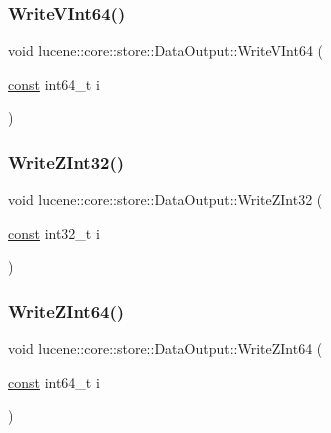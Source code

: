 \subsubsection{\texorpdfstring{Write\+V\+Int64()}{WriteVInt64()}}
{\footnotesize\ttfamily void lucene\+::core\+::store\+::\+Data\+Output\+::\+Write\+V\+Int64 (\begin{DoxyParamCaption}\item[{\mbox{\hyperlink{ZlibCrc32_8h_a2c212835823e3c54a8ab6d95c652660e}{const}} int64\+\_\+t}]{i }\end{DoxyParamCaption})\hspace{0.3cm}{\ttfamily [inline]}}

\mbox{\label{classlucene_1_1core_1_1store_1_1DataOutput_ac3a56b74f30cd1f61c7cd40d17830700}} 
\subsubsection{\texorpdfstring{Write\+Z\+Int32()}{WriteZInt32()}}
{\footnotesize\ttfamily void lucene\+::core\+::store\+::\+Data\+Output\+::\+Write\+Z\+Int32 (\begin{DoxyParamCaption}\item[{\mbox{\hyperlink{ZlibCrc32_8h_a2c212835823e3c54a8ab6d95c652660e}{const}} int32\+\_\+t}]{i }\end{DoxyParamCaption})\hspace{0.3cm}{\ttfamily [inline]}}

\mbox{\label{classlucene_1_1core_1_1store_1_1DataOutput_aad0abddbe300bdf599bf7464538891c1}} 
\subsubsection{\texorpdfstring{Write\+Z\+Int64()}{WriteZInt64()}}
{\footnotesize\ttfamily void lucene\+::core\+::store\+::\+Data\+Output\+::\+Write\+Z\+Int64 (\begin{DoxyParamCaption}\item[{\mbox{\hyperlink{ZlibCrc32_8h_a2c212835823e3c54a8ab6d95c652660e}{const}} int64\+\_\+t}]{i }\end{DoxyParamCaption})\hspace{0.3cm}{\ttfamily [inline]}}



